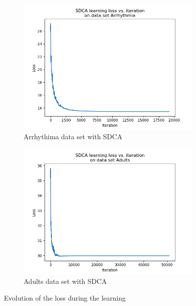 \documentclass{article}
\begin{document}
\begin{figure}[H]
	\begin{subfigure}[t]{0.45\linewidth}
		\includegraphics[width=\linewidth]{figs/loss/arrhythmia_sdca.png}
		\caption{Arrhythima data set with SDCA}
	\end{subfigure}
	\begin{subfigure}[t]{0.45\linewidth}
		\includegraphics[width=\linewidth]{figs/loss/adults_sdca.png}
		\caption{Adults data set with SDCA}
	\end{subfigure}

	\caption{Evolution of the loss during the learning}
\end{figure}
\end{document}
